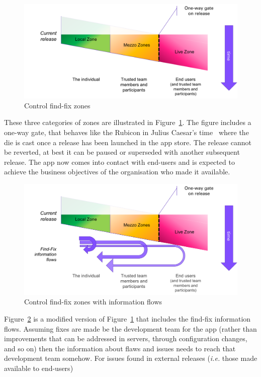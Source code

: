 \begin{figure}[htbp!]
    \centering
    \includegraphics[width=13cm]{images/my/control-find-fix-zones-a.png}
    \caption{Control find-fix zones}
    \label{fig:my:control-find-fix-zones-overview}
\end{figure}

These three categories of zones are illustrated in Figure~\ref{fig:my:control-find-fix-zones-overview}. The figure includes a one-way gate, that behaves like the Rubicon in Julius Caesar's time~\citep{wikipedia_rubicon} where the die is cast once a release has been launched in the app store. The release cannot be reverted, at best it can be paused or superseded with another subsequent release. The app now comes into contact with end-users and is expected to achieve the business objectives of the organisation who made it available.

\begin{figure}[htbp!]
    \centering
    \includegraphics[width=13cm]{images/my/control-find-fix-zones-with-information-flows.png}
    \caption{Control find-fix zones with information flows}
    \label{fig:my:control-find-fix-zones-with-information-flows}
\end{figure}

Figure~\ref{fig:my:control-find-fix-zones-with-information-flows} is a modified version of Figure~\ref{fig:my:control-find-fix-zones-overview} that includes the find-fix information flows. Assuming fixes are made be the development team for the app (rather than improvements that can be addressed in servers, through configuration changes, and so on) then the information about flaws and issues needs to reach that development team somehow. For issues found in external releases (\emph{i.e.} those made available to end-users) 


